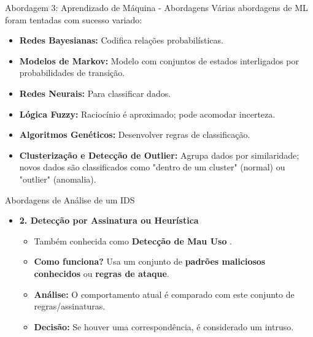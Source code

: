 \begin{frame}{Abordagem 3: Aprendizado de Máquina - Abordagens}
    Várias abordagens de ML foram tentadas com sucesso variado:

    \begin{itemize}

        \item \textbf{Redes Bayesianas:} Codifica relações probabilísticas.

        \item \textbf{Modelos de Markov:} Modelo com conjuntos de estados interligados por probabilidades de transição.

        \item \textbf{Redes Neurais:} Para classificar dados.

        \item \textbf{Lógica Fuzzy:} Raciocínio é aproximado; pode acomodar incerteza.

        \item \textbf{Algoritmos Genéticos:} Desenvolver regras de classificação.

        \item \textbf{Clusterização e Detecção de Outlier:} Agrupa dados por similaridade; novos dados são classificados como "dentro de um cluster" (normal) ou "outlier" (anomalia).
    \end{itemize}
\end{frame}

\begin{frame}{Abordagens de Análise de um IDS}

    \begin{itemize}




        \item \textbf{2. Detecção por Assinatura ou Heurística }
              \begin{itemize}
                  \item Também conhecida como \textbf{Detecção de Mau Uso }.
                  \item \textbf{Como funciona?} Usa um conjunto de \textbf{padrões maliciosos conhecidos} ou \textbf{regras de ataque}.
                  \item \textbf{Análise:} O comportamento atual é comparado com este conjunto de regras/assinaturas.
                  \item \textbf{Decisão:} Se houver uma correspondência, é considerado um intruso.
              \end{itemize}
    \end{itemize}
\end{frame}


